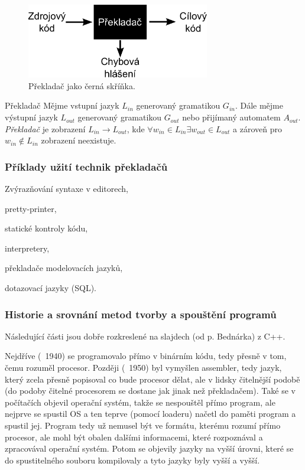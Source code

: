 \begin{figure}[h]
	\centering
	\includegraphics[width=8cm]{i2/softwarove_inzenyrstvi/obrazky/Prekladac-cerna_skrinka.pdf}
	\caption{Překladač jako černá skříňka.}
	\label{pic:Prekladac-cerna_skrinka}
\end{figure}
\begin{definiceN}{Překladač}
Mějme vstupní jazyk \(L_{in}\) generovaný gramatikou \(G_{in}\).
Dále mějme výstupní jazyk \(L_{out}\) generovaný gramatikou \(G_{out}\) nebo přijímaný automatem \(A_{out}\).
\emph{Překladač} je zobrazení \(L_{in} \to L_{out}\), kde \(\forall w_{in} \in L_{in} \exists w_{out} \in L_{out}\) a zároveň pro \(w_{in} \notin L_{in}\) zobrazení neexistuje.
\end{definiceN}


\subsubsection{Příklady užití technik překladačů}
\begin{pitemize}
	\item Zvýrazňování syntaxe v editorech,
	\item pretty-printer,
	\item statické kontroly kódu,
	\item interpretery,
	\item překladače modelovacích jazyků,
	\item dotazovací jazyky (SQL).
\end{pitemize}


\subsubsection{Historie a srovnání metod tvorby a spouštění programů}
Následující části jsou dobře rozkreslené na slajdech (od p. Bednárka) z C++.

Nejdříve (~1940) se programovalo přímo v binárním kódu, tedy přesně v tom, čemu rozuměl procesor. Později (~1950) byl vymyšlen assembler, tedy jazyk, který zcela přesně popisoval co bude procesor dělat, ale v lidsky čitelnější podobě (do podoby čitelné procesorem se dostane jak jinak než překladačem). Také se v počítačích objevil operační systém, takže se nespouštěl přímo program, ale nejprve se spustil OS a ten teprve (pomocí loaderu) načetl do paměti program a spustil jej. Program tedy už nemusel být ve formátu, kterému rozumí přímo procesor, ale mohl být obalen dalšími informacemi, které rozpoznával a zpracovával operační systém. Potom se objevily jazyky na vyšší úrovni, které se do spustitelného souboru kompilovaly a tyto jazyky byly vyšší a vyšší.

